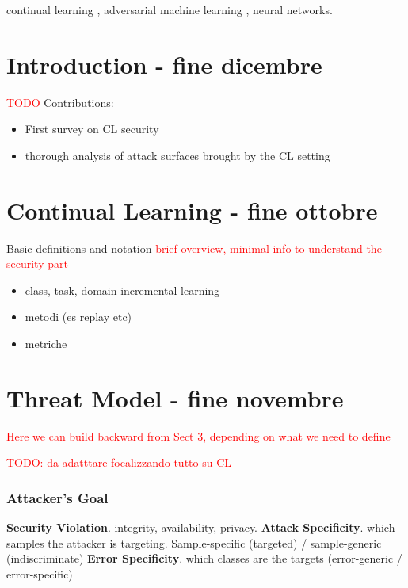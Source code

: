 \documentclass[5p,times]{elsarticle}
\newcommand{\myparagraph}[1]{\noindent \textbf{#1}.}
\begin{document}
\begin{frontmatter}
\begin{keyword}
continual learning \sep
adversarial machine learning \sep
neural networks.
\end{keyword}

\end{frontmatter}


\section{Introduction - fine dicembre}
\textcolor{red}{TODO}
Contributions:
\begin{itemize}
\item First survey on CL security
\item thorough analysis of attack surfaces brought by the CL setting

\end{itemize}

\section{Continual Learning - fine ottobre}
Basic definitions and notation
\textcolor{red}{brief overview, minimal info to understand the security part}

\begin{itemize}
    \item class, task, domain incremental learning  
    \item metodi (es replay etc) 
    \item metriche
\end{itemize}


\section{Threat Model - fine novembre}

\textcolor{red}{Here we can build backward from Sect 3, depending on what we need to define}


\textcolor{red}{TODO: da adatttare focalizzando tutto su CL}

\subsubsection{Attacker's Goal}
\myparagraph{Security Violation} integrity, availability, privacy.
\myparagraph{Attack Specificity} which samples the attacker is targeting. Sample-specific (targeted) / sample-generic (indiscriminate)
\myparagraph{Error Specificity} which classes are the targets (error-generic / error-specific)
\end{document}
